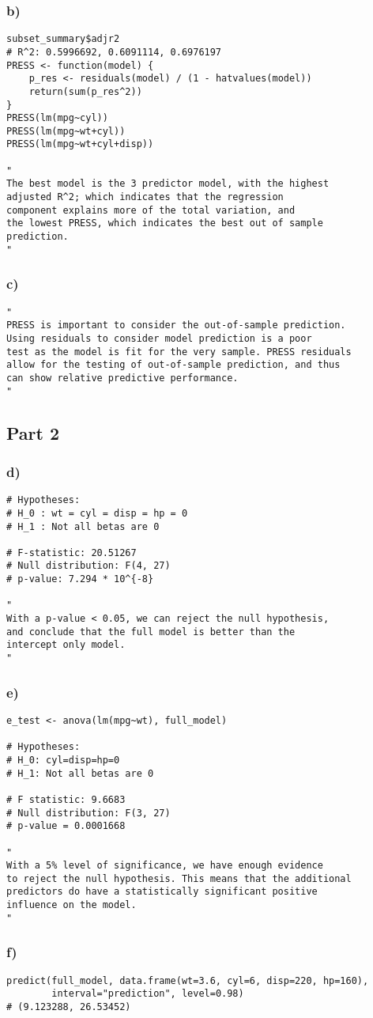 \documentclass{article}
\begin{document}
\subsubsection*{b)}
\begin{verbatim}
subset_summary$adjr2
# R^2: 0.5996692, 0.6091114, 0.6976197
PRESS <- function(model) {
    p_res <- residuals(model) / (1 - hatvalues(model))
    return(sum(p_res^2))
}
PRESS(lm(mpg~cyl))
PRESS(lm(mpg~wt+cyl))
PRESS(lm(mpg~wt+cyl+disp))
    
"
The best model is the 3 predictor model, with the highest
adjusted R^2; which indicates that the regression
component explains more of the total variation, and
the lowest PRESS, which indicates the best out of sample
prediction.
"
\end{verbatim}

\subsubsection*{c)}
\begin{verbatim}
"
PRESS is important to consider the out-of-sample prediction.
Using residuals to consider model prediction is a poor
test as the model is fit for the very sample. PRESS residuals
allow for the testing of out-of-sample prediction, and thus
can show relative predictive performance. 
"
\end{verbatim}

\subsection*{Part 2}
\subsubsection*{d)}
\begin{verbatim}
# Hypotheses:
# H_0 : wt = cyl = disp = hp = 0
# H_1 : Not all betas are 0
    
# F-statistic: 20.51267
# Null distribution: F(4, 27)
# p-value: 7.294 * 10^{-8}
    
"
With a p-value < 0.05, we can reject the null hypothesis,
and conclude that the full model is better than the
intercept only model.
"
\end{verbatim}

\subsubsection*{e)}
\begin{verbatim}
e_test <- anova(lm(mpg~wt), full_model)

# Hypotheses:
# H_0: cyl=disp=hp=0
# H_1: Not all betas are 0
    
# F statistic: 9.6683
# Null distribution: F(3, 27)
# p-value = 0.0001668
    
"
With a 5% level of significance, we have enough evidence
to reject the null hypothesis. This means that the additional
predictors do have a statistically significant positive
influence on the model.
"
\end{verbatim}
\subsubsection*{f)}
\begin{verbatim}
predict(full_model, data.frame(wt=3.6, cyl=6, disp=220, hp=160), 
        interval="prediction", level=0.98)
# (9.123288, 26.53452)
\end{verbatim}
\end{document}
